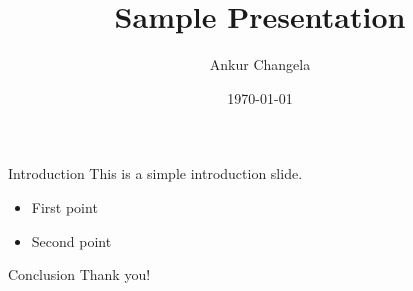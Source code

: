 \documentclass{beamer}
\title{Sample Presentation}
\author{Ankur Changela}
\date{\today}
\begin{document}
\frame{\titlepage}

\begin{frame}{Introduction}
This is a simple introduction slide.
\begin{itemize}
  \item First point
  \item Second point
\end{itemize}
\end{frame}

\begin{frame}{Conclusion}
Thank you!
\end{frame}
\end{document}

